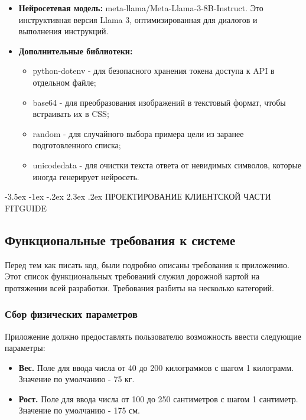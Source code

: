 \documentclass[14pt, a4paper]{extarticle}
\makeatletter
\renewcommand\section{\@startsection {section}{1}{\z@}%
{-3.5ex \@plus -1ex \@minus -.2ex}%
{2.3ex \@plus.2ex}%
{\centering\normalfont\Large\bfseries}}
\makeatother
\begin{document}
\begin{enumerate}
\begin{itemize}
\item \textbf{Нейросетевая модель:} meta-llama/Meta-Llama-3-8B-Instruct. Это инструктивная версия Llama 3, оптимизированная для диалогов и выполнения инструкций.

\item \textbf{Дополнительные библиотеки:}
\begin{itemize}
\item python-dotenv - для безопасного хранения токена доступа
к API в отдельном файле;
\item base64 - для преобразования изображений в текстовый формат, чтобы встраивать их в CSS;
\item random - для случайного выбора примера цели из заранее подготовленного списка;
\item unicodedata - для очистки текста ответа от невидимых символов, которые иногда генерирует нейросеть.
\end{itemize}
\end{itemize}

\newpage
\section{ПРОЕКТИРОВАНИЕ КЛИЕНТСКОЙ ЧАСТИ FITGUIDE}

\subsection{Функциональные требования к системе}

\noindent Перед тем как писать код, были подробно описаны требования к приложению. Этот список функциональных требований служил дорожной картой на протяжении всей разработки. Требования разбиты на несколько категорий.

\subsubsection{Сбор физических параметров}

\noindent Приложение должно предоставлять пользователю возможность ввести следующие параметры:

\begin{itemize}
\item \textbf{Вес.} Поле для ввода числа от 40 до 200 килограммов с шагом 1 килограмм. Значение по умолчанию - 75 кг.

\item \textbf{Рост.} Поле для ввода числа от 100 до 250 сантиметров с шагом 1 сантиметр. Значение по умолчанию - 175 см.


\end{itemize}
\end{enumerate}
\end{document}
